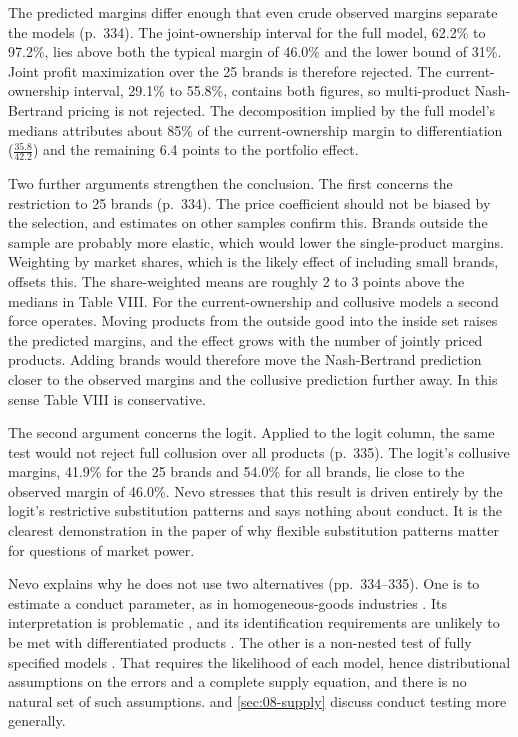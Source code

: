  The predicted margins differ enough that even crude observed margins separate the models
(p.~334). The joint-ownership interval for the full model, 62.2\% to 97.2\%, lies above both the typical margin
of 46.0\% and the lower bound of 31\%. Joint profit maximization over the 25 brands is therefore rejected. The
current-ownership interval, 29.1\% to 55.8\%, contains both figures, so multi-product Nash-Bertrand pricing is
not rejected. The decomposition implied by the full model's medians attributes about 85\% of the
current-ownership margin to differentiation ($\frac{35.8}{42.2}$) and the remaining 6.4 points to the
portfolio effect.

Two further arguments strengthen the conclusion. The first concerns the restriction to 25 brands (p.~334). The
price coefficient should not be biased by the selection, and estimates on other samples confirm this. Brands
outside the sample are probably more elastic, which would lower the single-product margins. Weighting by
market shares, which is the likely effect of including small brands, offsets this. The share-weighted means
are roughly 2 to 3 points above the medians in Table VIII. For the current-ownership and collusive models a second force operates. Moving products from the
outside good into the inside set raises the predicted margins, and the effect grows with the number of jointly
priced products. Adding brands would therefore move the Nash-Bertrand prediction closer to the observed margins
and the collusive prediction further away. In this sense Table VIII is conservative.

The second argument concerns the logit. Applied to the logit column, the same test would not reject full
collusion over all products (p.~335). The logit's collusive margins, 41.9\% for the 25 brands and 54.0\% for
all brands, lie close to the observed margin of 46.0\%. Nevo stresses that this result is driven entirely by the logit's restrictive
substitution patterns and says nothing about conduct. It is the clearest demonstration in the paper of why
flexible substitution patterns matter for questions of market power.

 Nevo explains why he does not use two alternatives (pp.~334--335). One is to
estimate a conduct parameter, as in homogeneous-goods industries \citep{Bresnahan1989}. Its interpretation is
problematic \citep{Corts1999}, and its identification requirements are unlikely to be met with differentiated
products \citep{Nevo1998}. The other is a non-nested test of fully specified models
\citep{Bresnahan1987,GasmiLaffontVuong1992}. That requires the likelihood of each model, hence distributional
assumptions on the errors and a complete supply equation, and there is no natural set of such assumptions.
 and \cref{sec:08-supply} discuss conduct testing more generally.

